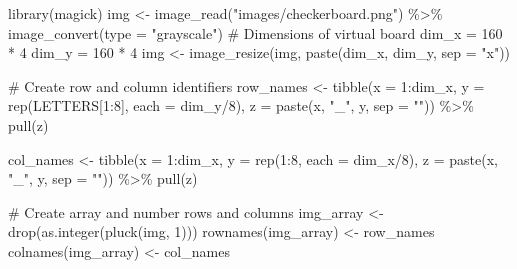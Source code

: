 \documentclass[
  letterpaper,
  DIV=11,
  numbers=noendperiod]{scrreprt}
\newenvironment{Shaded}{\begin{snugshade}}{\end{snugshade}}
\newcommand{\AttributeTok}[1]{\textcolor[rgb]{0.40,0.45,0.13}{#1}}
\newcommand{\CommentTok}[1]{\textcolor[rgb]{0.37,0.37,0.37}{#1}}
\newcommand{\DecValTok}[1]{\textcolor[rgb]{0.68,0.00,0.00}{#1}}
\newcommand{\FunctionTok}[1]{\textcolor[rgb]{0.28,0.35,0.67}{#1}}
\newcommand{\NormalTok}[1]{\textcolor[rgb]{0.00,0.23,0.31}{#1}}
\newcommand{\OtherTok}[1]{\textcolor[rgb]{0.00,0.23,0.31}{#1}}
\newcommand{\SpecialCharTok}[1]{\textcolor[rgb]{0.37,0.37,0.37}{#1}}
\newcommand{\StringTok}[1]{\textcolor[rgb]{0.13,0.47,0.30}{#1}}
\begin{document}
\begin{Shaded}
\begin{Highlighting}[]
\FunctionTok{library}\NormalTok{(magick)}
\NormalTok{img }\OtherTok{\textless{}{-}} \FunctionTok{image\_read}\NormalTok{(}\StringTok{"images/checkerboard.png"}\NormalTok{) }\SpecialCharTok{\%\textgreater{}\%} 
  \FunctionTok{image\_convert}\NormalTok{(}\AttributeTok{type =} \StringTok{"grayscale"}\NormalTok{)}
\CommentTok{\# Dimensions of virtual board}
\NormalTok{dim\_x }\OtherTok{=} \DecValTok{160} \SpecialCharTok{*} \DecValTok{4}
\NormalTok{dim\_y }\OtherTok{=} \DecValTok{160} \SpecialCharTok{*} \DecValTok{4}
\NormalTok{img }\OtherTok{\textless{}{-}} \FunctionTok{image\_resize}\NormalTok{(img, }\FunctionTok{paste}\NormalTok{(dim\_x, dim\_y, }\AttributeTok{sep =} \StringTok{"x"}\NormalTok{))}


\CommentTok{\# Create row and column identifiers}
\NormalTok{row\_names }\OtherTok{\textless{}{-}}  \FunctionTok{tibble}\NormalTok{(}\AttributeTok{x =} \DecValTok{1}\SpecialCharTok{:}\NormalTok{dim\_x, }\AttributeTok{y =} \FunctionTok{rep}\NormalTok{(LETTERS[}\DecValTok{1}\SpecialCharTok{:}\DecValTok{8}\NormalTok{], }\AttributeTok{each =}\NormalTok{ dim\_y}\SpecialCharTok{/}\DecValTok{8}\NormalTok{), }\AttributeTok{z =} \FunctionTok{paste}\NormalTok{(x, }\StringTok{"\_"}\NormalTok{, y, }\AttributeTok{sep =} \StringTok{""}\NormalTok{)) }\SpecialCharTok{\%\textgreater{}\%} \FunctionTok{pull}\NormalTok{(z)}

\NormalTok{col\_names }\OtherTok{\textless{}{-}}  \FunctionTok{tibble}\NormalTok{(}\AttributeTok{x =} \DecValTok{1}\SpecialCharTok{:}\NormalTok{dim\_x, }\AttributeTok{y =} \FunctionTok{rep}\NormalTok{(}\DecValTok{1}\SpecialCharTok{:}\DecValTok{8}\NormalTok{, }\AttributeTok{each =}\NormalTok{ dim\_x}\SpecialCharTok{/}\DecValTok{8}\NormalTok{), }\AttributeTok{z =} \FunctionTok{paste}\NormalTok{(x, }\StringTok{"\_"}\NormalTok{, y, }\AttributeTok{sep =} \StringTok{""}\NormalTok{)) }\SpecialCharTok{\%\textgreater{}\%} \FunctionTok{pull}\NormalTok{(z)}

\CommentTok{\# Create array and number rows and columns}
\NormalTok{img\_array }\OtherTok{\textless{}{-}} \FunctionTok{drop}\NormalTok{(}\FunctionTok{as.integer}\NormalTok{(}\FunctionTok{pluck}\NormalTok{(img, }\DecValTok{1}\NormalTok{)))}
\FunctionTok{rownames}\NormalTok{(img\_array) }\OtherTok{\textless{}{-}}\NormalTok{ row\_names}
\FunctionTok{colnames}\NormalTok{(img\_array) }\OtherTok{\textless{}{-}}\NormalTok{ col\_names}



\end{Highlighting}
\end{Shaded}
\end{document}
